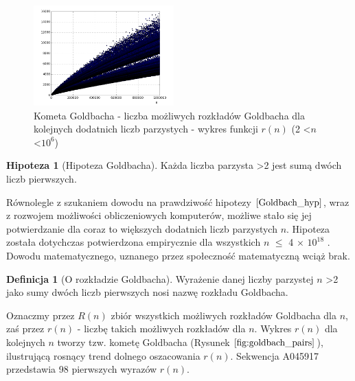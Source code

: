 \documentclass[10pt,onecolumn]{article}
\theoremstyle{definition}
\newtheorem{definition}{Definicja}
\theoremstyle{hypothesis}
\newtheorem{hypothesis}{Hipoteza}
\theoremstyle{capability}
\begin{document}
\begin{figure}
  \begin{center}
    \includegraphics[width=0.48\textwidth]{f_goldbach_pairs}
  \end{center}
  \caption{Kometa Goldbacha - liczba możliwych rozkładów Goldbacha dla kolejnych dodatnich liczb parzystych - wykres funkcji $r(n)$ (2 \textless $n$ \textless $10^6$)}
  \label{fig:goldbach_pairs}
\end{figure}

\begin{hypothesis}[Hipoteza Goldbacha]
Każda liczba parzysta \textgreater 2 jest sumą dwóch liczb pierwszych.
\label{Goldbach_hyp}
\end{hypothesis}

Równolegle z szukaniem dowodu na prawdziwość hipotezy $\ref{Goldbach_hyp}$, wraz z rozwojem możliwości obliczeniowych komputerów, możliwe stało się jej potwierdzanie dla coraz to większych dodatnich liczb parzystych $n$. Hipoteza została dotychczas potwierdzona empirycznie dla wszystkich $n$ $\leq$ 4 $\times$ $10^{18}$ \cite{oliveira2012}. Dowodu matematycznego, uznanego przez społeczność matematyczną wciąż brak.\par

\begin{definition} [O rozkładzie Goldbacha]
Wyrażenie danej liczby parzystej $n$ \textgreater 2 jako sumy dwóch liczb pierwszych nosi nazwę rozkładu Goldbacha.
\end{definition}

Oznaczmy przez $R(n)$ zbiór wszystkich możliwych rozkładów Goldbacha dla $n$, zaś przez $r(n)$ - liczbę takich możliwych rozkładów dla $n$. 
Wykres $r(n)$ dla kolejnych $n$ tworzy tzw. kometę Goldbacha (Rysunek $\ref{fig:goldbach_pairs}$), ilustrującą rosnący trend dolnego oszacowania $r(n)$. Sekwencja A045917 przedstawia 98 pierwszych wyrazów $r(n)$.
\end{document}
